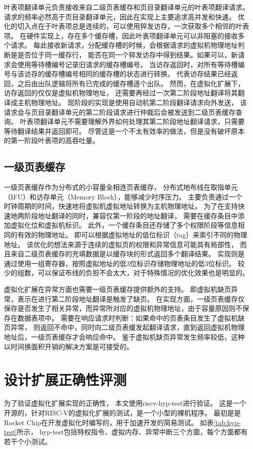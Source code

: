 叶表项翻译单元负责接收来自二级页表缓存和页目录翻译单元的叶表项翻译请求。
请求的频率必然高于页目录翻译单元，因此在实现上主要追求高并发和快速。
优化的切入点在于叶表项总是连续的，可以使用猝发访存，一次获取多个相邻的叶表项。
在硬件实现上，存在多个缓存槽，因此叶表项翻译单元可以非阻塞的接收多个请求。
每此接收新请求，分配缓存槽的时候，会根据请求的虚拟机物理地址判断是是否位于同一缓存行，
能否在同一个猝发访存中得到结果。如果可以，新请求会使用等待槽编号记录旧请求的缓存槽编号。
当访存返回时，对所有等待槽编号与该访存的缓存槽编号相同的缓存槽的状态进行转换。
代表访存结果已经返回，之后由出队逻辑将所有已完成的缓存槽逐个出队。
然而，在虚拟化扩展下，访存返回的仅仅是虚拟机物理地址，
还需要再经过一次第二阶段地址翻译将其翻译成主机物理地址。
现阶段的实现是使用自动机第二阶段翻译请求向外发送，
该请求会与页目录翻译单元的第二阶段请求进行仲裁后会被发送到二级页表缓存查询。
叶表项翻译单元不需要理解外界如何处理其第二阶段地址翻译请求，只需要等待翻译结果并返回即可。
尽管这是一个不太有效率的做法，但是没有破坏原本的第一阶段叶表项的高吞吐量。

\subsection{一级页表缓存}
一级页表缓存作为分布式的小容量全相连页表缓存，
分布式地布线在取指单元（IFU）和访存单元（Memory Block），能够减少时序压力。
主要负责通过一个时钟周期的时间，快速地将虚拟机虚拟地址转换为主机物理地址。
为了在支持快速地两阶段地址翻译的同时，兼容仅第一阶段的地址翻译，
需要在缓存条目中添加虚拟化位和虚拟机标识。
此外，一个缓存条目还存储了多个权限阶段等信息相同的有效的物理地址。
即可以根据虚拟地址的低位标识（tag）来索引不同的物理地址。
该优化的想法来源于连续的虚拟页的权限和异常信息可能具有局部性，
而且来自二级页表缓存的充填数据是以缓存块的形式返回多个翻译结果。
实现则是通过使用一组寄存器，按照虚拟地址的低3位标识存储物理地址的低3位标识。
较少的组数，可以保证布线的负担不会太大，对于特殊情况的优化效果也是明显的。

虚拟化扩展在异常方面也需要一级页表缓存提供额外的支持。
即虚拟机缺页异常，表示在进行第二阶段地址翻译是触发了缺页。
在实现方面，一级页表缓存仅保存是否发生了相关异常，而异常所对应的虚拟机物理地址，由于容量原因则不保存在数据表项中。
需要在响应请求时判断：如果命中的页表条目发生了虚拟机缺页异常，
则返回不命中，同时向二级页表缓发起翻译请求，直到返回虚拟机物理地址后，一级页表缓存才会响应命中。
鉴于虚拟机缺页异常发生频率较低，这种以时间换面积开销的解决方案是可接受的。

\section{设计扩展正确性评测}
为了验证虚拟化扩展实现的正确性，
本文使用riscv-hyp-test\cite{itco2022rocket}进行验证。
这是一个开源的，针对RISC-V的虚拟化扩展的测试，是一个小型的裸机程序。
最初是是Rocket Chip在开发虚拟化时编写的，用于加速开发的简易测试。
如表\ref{tab:hyp-test}所示，
hyp-test包括特权指令、虚拟内存、异常中断三个方面，每个方面都有若干个小测试。

